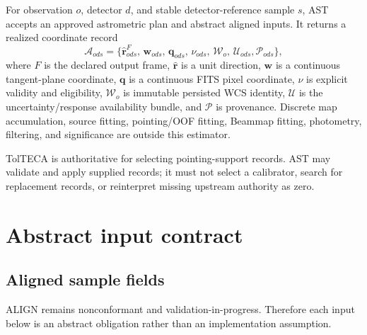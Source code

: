 \documentclass[11pt]{article}
\begin{document}
For observation $o$, detector $d$, and stable detector-reference sample $s$,
AST accepts an approved astrometric plan and abstract aligned inputs.  It
returns a realized coordinate record
\[
 \mathcal{A}_{ods} =
 \{\widehat{\boldsymbol r}_{ods}^{F},\,\boldsymbol w_{ods},\,
   \boldsymbol q_{ods},\,\nu_{ods},\,\mathcal{W}_{o},\,\mathcal{U}_{ods},
   \mathcal{P}_{ods}\},
\]
where $F$ is the declared output frame, $\widehat{\boldsymbol r}$ is a unit
direction, $\boldsymbol w$ is a continuous tangent-plane coordinate,
$\boldsymbol q$ is a continuous FITS pixel coordinate, $\nu$ is explicit
validity and eligibility, $\mathcal W_o$ is immutable persisted WCS identity,
$\mathcal U$ is the uncertainty/response availability bundle, and
$\mathcal P$ is provenance.  Discrete map accumulation, source fitting,
pointing/OOF fitting, Beammap fitting, photometry, filtering, and significance
are outside this estimator.

TolTECA is authoritative for selecting pointing-support records.  AST may
validate and apply supplied records; it must not select a calibrator, search
for replacement records, or reinterpret missing upstream authority as zero.

\section{Abstract input contract}

\subsection{Aligned sample fields}

ALIGN remains nonconformant and validation-in-progress.  Therefore each input
below is an abstract obligation rather than an implementation assumption.
\end{document}
